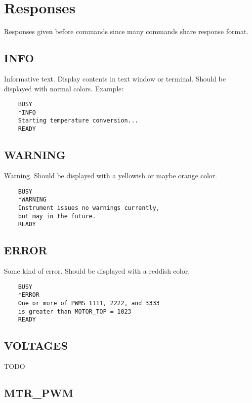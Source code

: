 \documentclass{article}
\begin{document}
\section{Responses}

Responses given before commands since many commands share response format.

\subsection{INFO}

Informative text.
Display contents in text window or terminal.
Should be displayed with normal colors.
Example:

\begin{lstlisting}
    BUSY
    *INFO
    Starting temperature conversion...
    READY
\end{lstlisting}


\subsection{WARNING}

Warning.
Should be displayed with a yellowish or maybe orange color.

\begin{lstlisting}
    BUSY
    *WARNING
    Instrument issues no warnings currently,
    but may in the future.
    READY
\end{lstlisting}


\subsection{ERROR}

Some kind of error.
Should be displayed with a reddish color.

\begin{lstlisting}
    BUSY
    *ERROR
    One or more of PWMS 1111, 2222, and 3333
    is greater than MOTOR_TOP = 1023
    READY
\end{lstlisting}


\subsection{VOLTAGES}

TODO

\subsection{MTR\_PWM}
\end{document}
